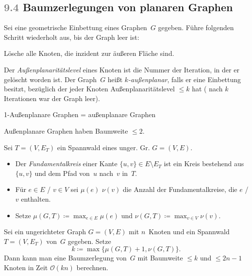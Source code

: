 \documentclass{cheat-sheet}
\renewcommand{\O}{\mathcal{O}} %
\newcommand{\scriptSection}[1]{\textcolor{gray}{#1}\enspace}
\begin{document}

\subsection{\scriptSection{9.4} Baumzerlegungen von planaren Graphen}

\begin{defn}
  Sei eine geometrische Einbettung eines Graphen~$G$ gegeben.
  Führe folgenden Schritt wiederholt aus, bis der Graph leer ist:

  \hfill\begin{minipage}{0.95 \linewidth}
    Lösche alle Knoten, die inzident zur äußeren Fläche sind.
  \end{minipage}

  Der \textit{Außenplanaritätslevel} eines Knoten ist die Nummer der Iteration, in der er gelöscht worden ist.
  Der Graph~$G$ heißt \emph{$k$-außenplanar}, falls er eine Einbettung besitzt, bezüglich der jeder Knoten Außenplanaritätslevel $\leq k$ hat (\dh{} nach $k$ Iterationen war der Graph leer).
\end{defn}

\begin{bem}
  1-Außenplanare Graphen = außenplanare Graphen
\end{bem}

\begin{lem}
  Außenplanare Graphen haben Baumweite $\leq 2$.
\end{lem}

\begin{defn}
  Sei $T \!=\! (V, E_T)$ ein Spannwald eines unger. Gr. $G \!=\! (V, E)$.
  \begin{itemize}
    \item Der \emph{Fundamentalkreis} einer Kante $\{ u, v \} \in E \setminus E_T$ ist ein Kreis bestehend aus $\{ u, v \}$ und dem Pfad von~$u$ nach~$v$ in~$T$.
    \item Für $e \in E$ / $v \in V$ sei $\mu(e)$ $\nu(v)$ die Anzahl der Fundamentalkreise, die $e$ / $v$ enthalten.
    \item Setze $\mu(G, T) \coloneqq {\max}_{e \in E} \mu(e)$ und $\nu(G, T) \coloneqq {\max}_{v \in V} \nu(v)$.
  \end{itemize}
\end{defn}

\begin{lem}
  Sei ein ungerichteter Graph $G = (V, E)$ mit $n$~Knoten und ein Spannwald $T = (V, E_T)$ von~$G$ gegeben.
  Setze
  \[ k \coloneqq \max \{ \mu(G, T) + 1, \nu(G, T) \}. \]
  Dann kann man eine Baumzerlegung von~$G$ mit Baumweite $\leq k$ und $\leq 2n - 1$ Knoten in Zeit $\O(k n)$ berechnen.
\end{lem}
\end{document}
